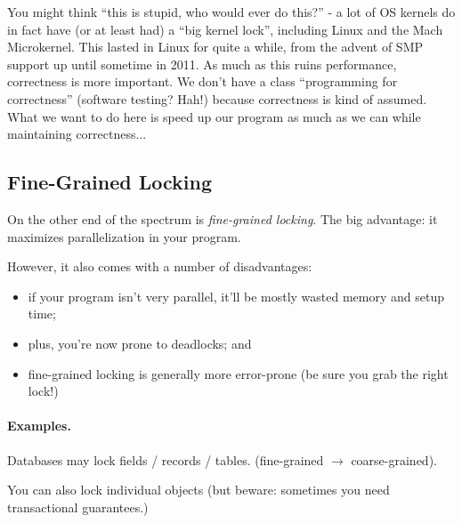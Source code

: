 You might think ``this is stupid, who would ever do this?'' - a lot of OS kernels do in fact have (or at least had) a ``big kernel lock'', including Linux and the Mach Microkernel. This lasted in Linux for quite a while, from the advent of SMP support up until sometime in 2011. As much as this ruins performance, correctness is more important. We don't have a class ``programming for correctness'' (software testing? Hah!) because correctness is kind of assumed. What we want to do here is speed up our program as much as we can while maintaining correctness...

\subsection*{Fine-Grained Locking}
On the other end of the spectrum is \emph{fine-grained locking}. The big
advantage: it maximizes parallelization in your program.

However, it also comes with a number of disadvantages:
  \begin{itemize}
    \item if your program isn't very parallel, it'll be mostly wasted memory and setup time;
    \item plus, you're now prone to deadlocks; and
    \item fine-grained locking is generally more error-prone (be sure you grab the right lock!)
  \end{itemize}

\paragraph{Examples.}

    Databases may lock fields / records / tables. (fine-grained $\rightarrow$ coarse-grained).

    You can also lock individual objects (but beware: sometimes you need transactional guarantees.)




